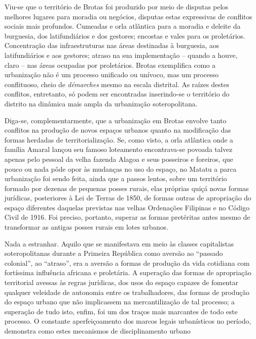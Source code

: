 Viu-se que o território de Brotas foi produzido por meio de disputas pelos melhores lugares para moradia ou negócios, disputas estas expressivas de conflitos sociais mais profundos. Cumeadas e orla atlântica para a moradia e deleite da burguesia, dos latifundiários e dos gestores; encostas e vales para os proletários. Concentração das infraestruturas nas áreas destinadas à burguesia, aos latifundiários e aos gestores; atraso na sua implementação – quando a houve, claro – nas áreas ocupadas por proletários. Brotas exemplifica como a urbanização não é um processo unificado ou unívoco, mas um processo conflituoso, cheio de \textit{démarches} mesmo na escala distrital. As raízes destes conflitos, entretanto, só podem ser encontradas inserindo-se o território do distrito na dinâmica mais ampla da urbanização soteropolitana.

Diga-se, complementarmente, que a urbanização em Brotas envolve tanto conflitos na produção de novos espaços urbanos quanto na modificação das formas herdadas de territorialização. Se, como visto, a orla atlântica onde a família Amaral lançou seu famoso loteamento encontrava-se povoada talvez apenas pelo pessoal da velha fazenda Alagoa e seus posseiros e foreiros, que pouco ou nada pôde opor às mudanças no uso do espaço, no Matatu a parca urbanização foi sendo feita, ainda que a passos lentos, sobre um território formado por dezenas de pequenas posses rurais, elas próprias quiçá novas formas jurídicas, posteriores à Lei de Terras de 1850, de formas outras de apropriação do espaço diferentes daquelas previstas nas velhas Ordenações Filipinas e no Código Civil de 1916. Foi preciso, portanto, superar as formas pretéritas antes mesmo de transformar as antigas posses rurais em lotes urbanos.

Nada a estranhar. Aquilo que se manifestava em meio às classes capitalistas soteropolitanas durante a Primeira República como aversão ao ``passado colonial'', ao ``atraso'', era a aversão a formas de produção da vida cotidiana com fortíssima influência africana e proletária. A superação das formas de apropriação territorial avessas às regras jurídicas, dos usos do espaço capazes de fomentar qualquer veleidade de autonomia entre os trabalhadores, das formas de produção do espaço urbano que não implicassem na mercantilização de tal processo; a superação de tudo isto, enfim, foi um dos traços mais marcantes de todo este processo. O constante aperfeiçoamento dos marcos legais urbanísticos no período, demonstra como estes mecanismos de disciplinamento urbano 

